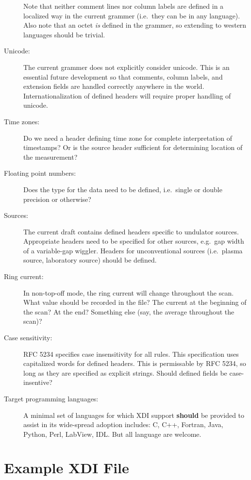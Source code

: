 \documentclass{article}
\newcommand{\xdi}{\textsf{XDI}}
\begin{document}
\begin{description}
  Note that neither comment lines nor column labels are defined in a
  localized way in the current grammer (i.e.\ they can be in any
  language).  Also note that an octet \textit{is} defined in the
  grammer, so extending to western languages should be trivial.
\item[Unicode:] The current grammer does not explicitly consider
  unicode.  This is an essential future development so that comments,
  column labels, and extension fields are handled correctly anywhere
  in the world.  Internationalization of defined headers will require
  proper handling of unicode.\label{anchor:unicode}
\item[Time zones:] Do we need a header defining time zone for complete
  interpretation of timestamps? Or is the source header sufficient for
  determining location of the measurement?\label{anchor:timezones}
\item[Floating point numbers:] Does the type for the data need to be
  defined, i.e.\ single or double precision or
  otherwise?\label{anchor:floats}
\item[Sources:] The current draft contains defined headers specific to
  undulator sources.  Appropriate headers need to be specified for
  other sources, e.g.\ gap width of a variable-gap wiggler.  Headers
  for unconventional sources (i.e.\ plasma source, laboratory source)
  should be defined.\label{anchor:sources}
\item[Ring current:] In non-top-off mode, the ring current will change
  throughout the scan.  What value should be recorded in the file?
  The current at the beginning of the scan?  At the end?  Something
  else (say, the average throughout the scan)?\label{anchor:current}
\item[Case sensitivity:] RFC 5234 specifies case insensitivity for all
  rules.  This specification uses capitalized words for defined
  headers.  This is permissable by RFC 5234, so long as they are
  specified as explicit strings.  Should defined fields be
  case-insentive?
\item[Target programming languages:] A minimal set of languages for
  which {\xdi} support \textbf{should} be provided to assist in its
  wide-spread adoption includes: C, C++, Fortran, Java, Python, Perl,
  LabView, IDL.  But all language are welcome.
\end{description}

\newpage
\appendix

\section{Example XDI File}
\label{apdx:example}
\end{document}
